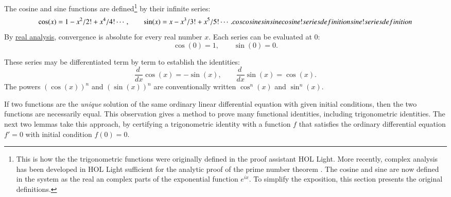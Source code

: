 The cosine and sine functions are defined\footnote{This is how the the
  trigonometric functions were originally defined in the proof
  assistant HOL Light.  More recently, complex analysis has been
  developed in HOL Light sufficient for the analytic proof of
  the prime number theorem \cite{harrison:2009:pnt}.  The cosine and
  sine are now defined in the system as the real an complex parts of
  the exponential function $e^{i x}$.  To simplify the exposition, this section
  presents the original definitions.} by their infinite series:%
\begin{equation}\label{eqn:cos-def}\cos(x) = 1 - x^2/2! + x^4/4! \cdots,\qquad
  \sin(x) = x - x^3/3! + x^5/5! \cdots.
  \indy{Notation}{cos}%
  \indy{Index}{cosine}%
  \indy{Notation}{sin}%
  \indy{Index}{sine}%
  \indy{Index}{cosine!series definition}%
  \indy{Index}{sine!series definition}%
\end{equation}
By \hyperref[back:analysis]{real analysis}, convergence is absolute
for every real number $x$.  Each series can be evaluated at $0$:
\begin{equation}\label{eqn:cos0}
  \cos(0) = 1,\qquad \sin(0) = 0.
\end{equation}


These series may be differentiated term by term to establish the
identities: %
\begin{equation}\label{eqn:cos'}
\frac{d\phantom{~}} {dx}\cos(x) 
= -\sin(x),\qquad \frac{ d\phantom{~} }{dx}\sin(x) = \cos(x).
\end{equation}
%
The powers $(\cos(x))^n$ and $(\sin(x))^n$ are conventionally written
$\cos^n(x)$ and $\sin^n(x)$.

If two functions are the {\it unique} solution of the same ordinary
linear differential equation with given initial conditions, then the
two functions are necessarily equal.  This observation gives
 a method to prove many functional identities,
including trigonometric identities.  
The next two lemmas take this approach, by
 certifying a trigonometric identity with a function $f$ that
satisfies the ordinary differential equation $f' = 0$ with initial
condition $f(0)=0$.  %


